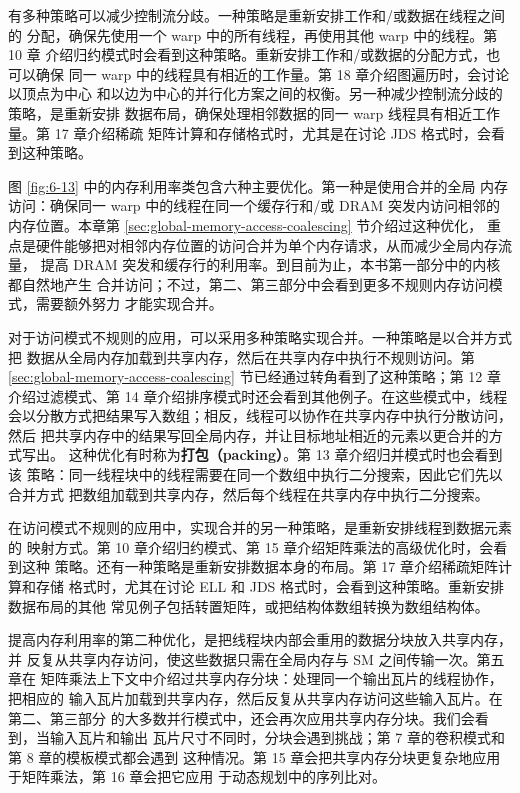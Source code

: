 有多种策略可以减少控制流分歧。一种策略是重新安排工作和/或数据在线程之间的
分配，确保先使用一个 warp 中的所有线程，再使用其他 warp 中的线程。第 10 章
介绍归约模式时会看到这种策略。重新安排工作和/或数据的分配方式，也可以确保
同一 warp 中的线程具有相近的工作量。第 18 章介绍图遍历时，会讨论以顶点为中心
和以边为中心的并行化方案之间的权衡。另一种减少控制流分歧的策略，是重新安排
数据布局，确保处理相邻数据的同一 warp 线程具有相近工作量。第 17 章介绍稀疏
矩阵计算和存储格式时，尤其是在讨论 JDS 格式时，会看到这种策略。

图 \ref{fig:6-13} 中的内存利用率类包含六种主要优化。第一种是使用合并的全局
内存访问：确保同一 warp 中的线程在同一个缓存行和/或 DRAM 突发内访问相邻的
内存位置。本章第 \ref{sec:global-memory-access-coalescing} 节介绍过这种优化，
重点是硬件能够把对相邻内存位置的访问合并为单个内存请求，从而减少全局内存流量，
提高 DRAM 突发和缓存行的利用率。到目前为止，本书第一部分中的内核都自然地产生
合并访问；不过，第二、第三部分中会看到更多不规则内存访问模式，需要额外努力
才能实现合并。

对于访问模式不规则的应用，可以采用多种策略实现合并。一种策略是以合并方式把
数据从全局内存加载到共享内存，然后在共享内存中执行不规则访问。第
\ref{sec:global-memory-access-coalescing} 节已经通过转角看到了这种策略；第 12
章介绍过滤模式、第 14 章介绍排序模式时还会看到其他例子。在这些模式中，线程
会以分散方式把结果写入数组；相反，线程可以协作在共享内存中执行分散访问，然后
把共享内存中的结果写回全局内存，并让目标地址相近的元素以更合并的方式写出。
这种优化有时称为\textbf{打包（packing）}。第 13 章介绍归并模式时也会看到该
策略：同一线程块中的线程需要在同一个数组中执行二分搜索，因此它们先以合并方式
把数组加载到共享内存，然后每个线程在共享内存中执行二分搜索。

在访问模式不规则的应用中，实现合并的另一种策略，是重新安排线程到数据元素的
映射方式。第 10 章介绍归约模式、第 15 章介绍矩阵乘法的高级优化时，会看到这种
策略。还有一种策略是重新安排数据本身的布局。第 17 章介绍稀疏矩阵计算和存储
格式时，尤其在讨论 ELL 和 JDS 格式时，会看到这种策略。重新安排数据布局的其他
常见例子包括转置矩阵，或把结构体数组转换为数组结构体。

提高内存利用率的第二种优化，是把线程块内部会重用的数据分块放入共享内存，并
反复从共享内存访问，使这些数据只需在全局内存与 SM 之间传输一次。第五章在
矩阵乘法上下文中介绍过共享内存分块：处理同一个输出瓦片的线程协作，把相应的
输入瓦片加载到共享内存，然后反复从共享内存访问这些输入瓦片。在第二、第三部分
的大多数并行模式中，还会再次应用共享内存分块。我们会看到，当输入瓦片和输出
瓦片尺寸不同时，分块会遇到挑战；第 7 章的卷积模式和第 8 章的模板模式都会遇到
这种情况。第 15 章会把共享内存分块更复杂地应用于矩阵乘法，第 16 章会把它应用
于动态规划中的序列比对。

